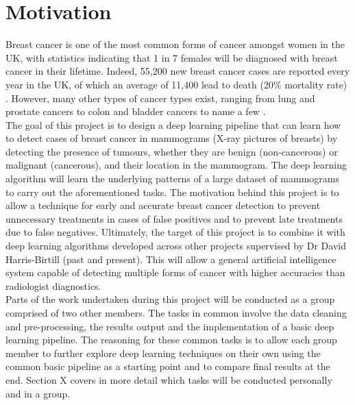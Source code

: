 \section{Motivation}

Breast cancer is one of the most common forms of cancer amongst women in the UK, with statistics indicating that 1 in 7 females will be diagnosed with breast cancer in their lifetime. Indeed, 55,200 new breast cancer cases are reported every year in the UK, of which an average of 11,400 lead to death (20\% mortality rate) \cite{BreastCancerResearchUK}. However, many other types of cancer types exist, ranging from lung and prostate cancers to colon and bladder cancers to name a few \cite{cokkinides2005american}.\\

The goal of this project is to design a deep learning pipeline that can learn how to detect cases of breast cancer in mammograms (X-ray pictures of breasts) by detecting the presence of tumours, whether they are benign (non-cancerous) or malignant (cancerous), and their location in the mammogram. The deep learning algorithm will learn the underlying patterns of a large dataset of mammograms to carry out the aforementioned tasks. The motivation behind this project is to allow a technique for early and accurate breast cancer detection to prevent unnecessary treatments in cases of false positives and to prevent late treatments due to false negatives. Ultimately, the target of this project is to combine it with deep learning algorithms developed across other projects supervised by Dr David Harris-Birtill (past and present). This will allow a general artificial intelligence system capable of detecting multiple forms of cancer with higher accuracies than radiologist diagnostics.\\

Parts of the work undertaken during this project will be conducted as a group comprised of two other members. The tasks in common involve the data cleaning and pre-processing, the results output and the implementation of a basic deep learning pipeline. The reasoning for these common tasks is to allow each group member to further explore deep learning techniques on their own using the common basic pipeline as a starting point and to compare final results at the end. Section X covers in more detail which tasks will be conducted personally and in a group.


